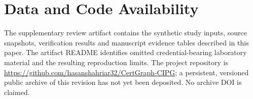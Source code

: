\section*{Data and Code Availability}
\noindent The supplementary review artifact contains the synthetic study inputs, source snapshots, verification results and manuscript evidence tables described in this paper. The artifact README identifies omitted credential-bearing laboratory material and the resulting reproduction limits. The project repository is \url{https://github.com/hasanshahriar32/CertGraph-CIPG}; a persistent, versioned public archive of this revision has not yet been deposited. No archive DOI is claimed.
